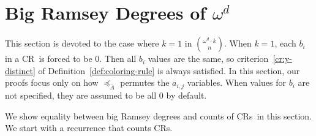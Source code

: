 \documentclass[10pt,a4paper]{article}
\newcommand{\om}{\omega}
\newcommand{\crulenospace}{CR}
\newcommand{\crule}{\crulenospace~}
\newcommand{\crules}{\crulenospace s~}
\newcommand{\crulesnospace}{\crulenospace s}
\newcommand{\xleq}{\preceq_{\overline{A}}}
\newcommand{\numpoints}{n}
\newcommand{\inumpoints}{i}
\newcommand{\idegr}{j}
\newcommand{\commonconst}{a}
\newcommand{\rareconst}{b}
\theoremstyle{plain}
\theoremstyle{definition}
\begin{document}
\section{Big Ramsey Degrees of \texorpdfstring{$\om^d$}{omega d}}\label{se:ord} 
This section is devoted to the case where $k=1$ in $\binom{\om^d \cdot k}{\numpoints}$. When $k=1$, each $\rareconst_{\inumpoints}$ in a \crule is forced to be 0. Then all $\rareconst_{\inumpoints}$ values are the same, so criterion~\ref{cr:y-distinct} of Definition~\ref{def:coloring-rule} is always satisfied. In this section, our proofs focus only on how $\xleq$ permutes the $\commonconst_{\inumpoints,\idegr}$ variables. When values for $\rareconst_{\inumpoints}$ are not specified, they are assumed to be all 0 by default.

We show equality between big Ramsey degrees and counts of \crules in this
section. We start with a recurrence that counts \crulesnospace.
\end{document}
